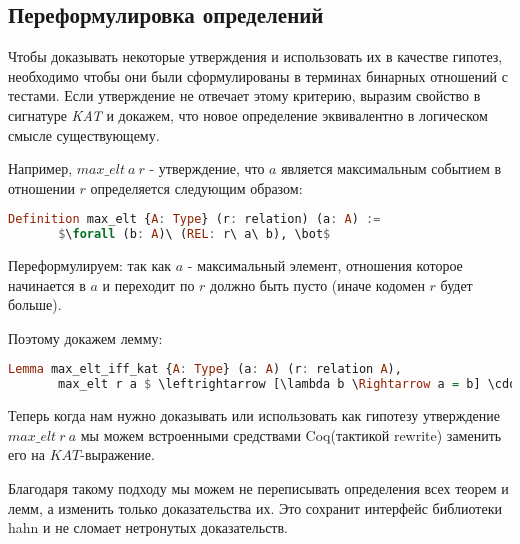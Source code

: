 \documentclass[times
              ]{itmo-student-thesis}
\begin{document}

    \subsection{Переформулировка определений}
   Чтобы доказывать некоторые утверждения и использовать их в качестве гипотез, необходимо чтобы они были сформулированы в терминах бинарных отношений с тестами.
   Если утверждение не отвечает этому критерию, выразим свойство в сигнатуре \textit{KAT} и докажем, что новое определение эквивалентно в логическом смысле существующему.

   Например, $max\_elt\ a\ r$ - утверждение, что $a$ является максимальным событием в отношении $r$ определяется следующим образом:
   \begin{lstlisting}[mathescape=true, language=haskell]
     Definition max_elt {A: Type} (r: relation) (a: A) :=
       $\forall (b: A)\ (REL: r\ a\ b), \bot$
   \end{lstlisting}

   Переформулируем: так как $ a $ - максимальный элемент, отношения которое начинается в $ a $ и переходит по $ r $ должно быть пусто (иначе кодомен $ r $ будет больше).

   Поэтому докажем лемму:
   \begin{lstlisting}[mathescape=true, language=haskell]
     Lemma max_elt_iff_kat {A: Type} (a: A) (r: relation A),
       max_elt r a $ \leftrightarrow [\lambda b \Rightarrow a = b] \cdot r \subseteq \emptyset$
   \end{lstlisting}

    Теперь когда нам нужно доказывать или использовать как гипотезу утверждение $ max\_elt\ r\ a $
    мы можем встроенными средствами Coq(тактикой rewrite) заменить его на $ KAT $-выражение.

    Благодаря такому подходу мы можем не переписывать определения всех теорем и лемм, а изменить только доказательства их.
    Это сохранит интерфейс библиотеки hahn и не сломает нетронутых доказательств.
\end{document}
